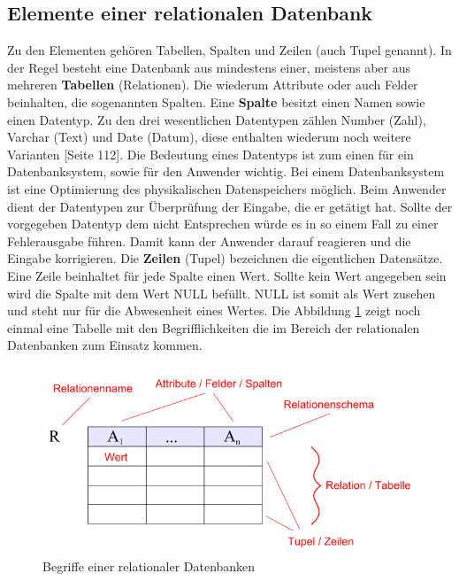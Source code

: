 \subsection{Elemente einer relationalen Datenbank}
Zu den Elementen gehören Tabellen, Spalten und Zeilen (auch Tupel genannt). In der Regel besteht eine Datenbank aus mindestens einer, meistens aber aus mehreren \textbf{Tabellen} (Relationen). Die wiederum Attribute oder auch Felder beinhalten, die sogenannten Spalten. Eine \textbf{Spalte} besitzt einen Namen sowie einen Datentyp. Zu den drei wesentlichen Datentypen zählen Number (Zahl), Varchar (Text) und Date (Datum), diese enthalten wiederum noch weitere Varianten \cite{Kemper2011}[Seite 112]. Die Bedeutung eines Datentyps ist zum einen für ein Datenbanksystem, sowie für den Anwender wichtig. Bei einem Datenbanksystem ist eine Optimierung des physikalischen Datenspeichers möglich. Beim Anwender dient der Datentypen zur Überprüfung der Eingabe, die er getätigt hat. Sollte der vorgegeben Datentyp dem nicht Entsprechen würde es in so einem Fall zu einer Fehlerausgabe führen. Damit kann der Anwender darauf reagieren und die Eingabe korrigieren.
Die \textbf{Zeilen} (Tupel) bezeichnen die eigentlichen Datensätze. Eine Zeile beinhaltet für jede Spalte einen Wert. Sollte kein Wert angegeben sein wird die Spalte mit dem Wert NULL befüllt. NULL ist somit als Wert zusehen und steht nur für die Abwesenheit eines Wertes. Die Abbildung \ref{pic:RDB:end} zeigt noch einmal eine Tabelle mit den Begrifflichkeiten die im Bereich der relationalen Datenbanken zum Einsatz kommen.
\begin{figure}[ht]
	\begin{center}
		\includegraphics[scale=0.5]{bilder/Begriffe_relationaler_Datenbanken.png}
		\caption{Begriffe einer relationaler Datenbanken \cite{wiki:rdb}}
		\label{pic:RDB:end}
	\end{center}
\end{figure}


